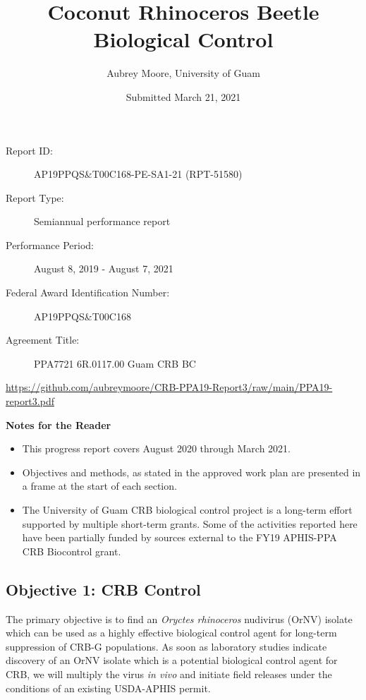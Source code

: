 \documentclass[12pt,letterpaper,english,bibliography=totocnumbered,abstract=on]{scrartcl}
\begin{document}
\titlehead{USDA-APHIS Progress Report}
\title{Coconut Rhinoceros Beetle Biological Control}
\author{Aubrey Moore, University of Guam}
\date{Submitted March 21, 2021}
\maketitle
\begin{description}	
	\item[Report ID:] AP19PPQS\&T00C168-PE-SA1-21 (RPT-51580)
	\item[Report Type:] Semiannual performance report
	\item[Performance Period:] August 8, 2019 - August 7, 2021
	\item[Federal Award Identification Number:] AP19PPQS\&T00C168
	\item[Agreement Title:] PPA7721 6R.0117.00 Guam CRB BC
\end{description}

\begin{footnotesize}
\url{https://github.com/aubreymoore/CRB-PPA19-Report3/raw/main/PPA19-report3.pdf}
\end{footnotesize}

\newpage{}
\tableofcontents{}

\listoftodos

\clearpage
\textbf{Notes for the Reader}
\begin{itemize}	
	\item This progress report covers August 2020 through March 2021.	
	\item Objectives and methods, as stated in the approved work plan \cite{mooreWorkPlanAPHISPPA2020} are presented in a frame at the start of each section. 	
	\item The University of Guam CRB biological control project is a long-term effort supported by multiple short-term grants. Some of the activities reported here have been partially funded by sources external to the FY19 APHIS-PPA CRB Biocontrol grant.  	
\end{itemize}


\newpage

\begin{framed}
\section{Objective 1: CRB Control}

The primary objective is to find an \textit{Oryctes rhinoceros} nudivirus (OrNV) isolate which can be used as a highly effective biological control agent for long-term suppression of CRB-G populations. As soon as laboratory studies indicate discovery of an OrNV isolate which is a potential biological control agent for CRB, we will multiply the virus \textit{in vivo} and initiate field releases under the conditions of an existing USDA-APHIS permit.
\end{framed}
\end{document}
